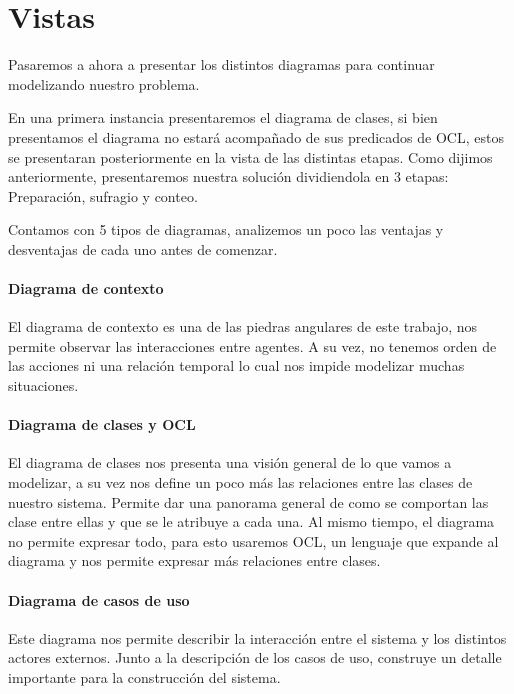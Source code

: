 \section{Vistas}

Pasaremos a ahora a presentar los distintos diagramas para continuar modelizando nuestro problema.

En una primera instancia presentaremos el diagrama de clases, si bien presentamos el diagrama no estará acompañado de sus predicados de OCL, estos se presentaran posteriormente en la vista de las distintas etapas. 
Como dijimos anteriormente, presentaremos nuestra solución dividiendola en 3 etapas: Preparación, sufragio y conteo. 

Contamos con 5 tipos de diagramas, analizemos un poco las ventajas y desventajas de cada uno antes de comenzar.

\paragraph{Diagrama de contexto} 

El diagrama de contexto es una de las piedras angulares de este trabajo, nos permite observar las interacciones entre agentes. A su vez, no tenemos orden de las acciones ni una relación temporal lo cual nos impide modelizar muchas situaciones.

\paragraph{Diagrama de clases y OCL}

El diagrama de clases nos presenta una visión general de lo que vamos a modelizar, a su vez nos define un poco más las relaciones entre las clases de nuestro sistema. Permite dar una panorama general de como se comportan las clase entre ellas y que se le atribuye a cada una. Al mismo tiempo, el diagrama no permite expresar todo, para esto usaremos OCL, un lenguaje que expande al diagrama y nos permite expresar más relaciones entre clases.

\paragraph{Diagrama de casos de uso}

Este diagrama nos permite describir la interacción entre el sistema y los distintos actores 
externos. Junto a la descripción de los casos de uso, construye un detalle importante para la 
construcción del sistema.

